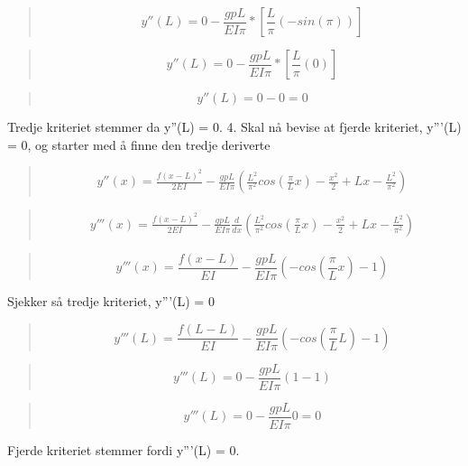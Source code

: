 \begin{quote}
\begin{equation*}
y''(L) = 0 - \frac{gpL}{EI\pi}* [\frac{L}{\pi} (-sin(\pi)) ]
\end{equation*}
\end{quote}

\begin{quote}
\begin{equation*}
y''(L) = 0 - \frac{gpL}{EI\pi}* [\frac{L}{\pi} (0) ]
\end{equation*}
\end{quote}

\begin{quote}
\begin{equation*}
y''(L) = 0 - 0 = 0
\end{equation*}
\end{quote}
Tredje kriteriet stemmer da y''(L) = 0.
4. Skal nå bevise at fjerde kriteriet, y'''(L) = 0, og starter med å finne den tredje deriverte
\begin{quote}
\begin{multline*}
y''(x) = \frac{f(x-L)^2}{2EI} - \frac{gpL}{EI\pi}(\frac{L^2}{\pi^2} cos(\frac{\pi}{L}x) - \frac{x^2}{2} + Lx - \frac{L^2}{\pi^2})
\end{multline*}
\end{quote}

\begin{quote}
\begin{multline*}
y'''(x) = \frac{f(x-L)^2}{2EI} - \frac{gpL}{EI\pi} \frac{d}{dx}(\frac{L^2}{\pi^2} cos(\frac{\pi}{L}x) - \frac{x^2}{2} + Lx - \frac{L^2}{\pi^2})
\end{multline*}
\end{quote}

\begin{quote}
\begin{equation}
y'''(x) = \frac{f(x-L)}{EI} - \frac{gpL}{EI\pi} (-cos(\frac{\pi}{L}x) - 1)
\end{equation}
\end{quote}
Sjekker så tredje kriteriet, y'''(L) = 0
\begin{quote}
\begin{equation*}
y'''(L) = \frac{f(L-L)}{EI} - \frac{gpL}{EI\pi} (-cos(\frac{\pi}{L}L) - 1)
\end{equation*}
\end{quote}

\begin{quote}
\begin{equation*}
y'''(L) = 0 - \frac{gpL}{EI\pi} (1 - 1)
\end{equation*}
\end{quote}

\begin{quote}
\begin{equation*}
y'''(L) = 0 - \frac{gpL}{EI\pi} 0 = 0
\end{equation*}
\end{quote}
Fjerde kriteriet stemmer fordi y'''(L) = 0.
